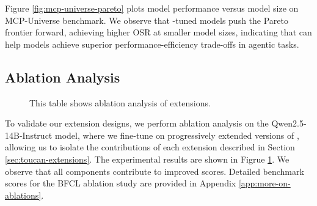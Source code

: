 Figure \ref{fig:mcp-universe-pareto} plots model performance versus model size on MCP-Universe benchmark. We observe that \datanamen-tuned models push the Pareto frontier forward, achieving higher OSR at smaller model sizes, indicating that \dataname can help models achieve superior performance-efficiency trade-offs in agentic tasks.

\subsection{Ablation Analysis}

\begin{figure}
  \vspace{-1.5em} %
  \centering
  \caption{This table shows ablation analysis of \dataname extensions.}
  \label{tab:ablation-results-table}
  \vspace{-1.5em} %
\end{figure}

To validate our extension designs, we perform ablation analysis on the Qwen2.5-14B-Instruct model, where we fine-tune on progressively extended versions of \datanamen, allowing us to isolate the contributions of each extension described in Section \ref{sec:toucan-extensions}. The experimental results are shown in Figrue \ref{tab:ablation-results-table}. We observe that all components contribute to improved scores. Detailed benchmark scores for the BFCL ablation study are provided in Appendix \ref{app:more-on-ablations}.

